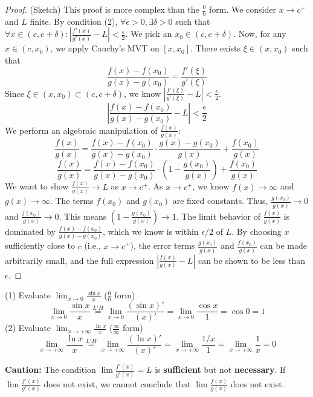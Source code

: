 \documentclass[oneside]{book}
\begin{document}
\begin{proof}
(Sketch) This proof is more complex than the $\frac{0}{0}$ form. We consider $x \to c^+$ and $L$ finite.
By condition (2), $\forall \epsilon > 0, \exists \delta > 0$ such that $\forall x \in (c, c+\delta): |\frac{f'(x)}{g'(x)} - L| < \frac{\epsilon}{2}$.
We pick an $x_0 \in (c, c+\delta)$.
Now, for any $x \in (c, x_0)$, we apply Cauchy's MVT on $[x, x_0]$. There exists $\xi \in (x, x_0)$ such that
\[
\frac{f(x) - f(x_0)}{g(x) - g(x_0)} = \frac{f'(\xi)}{g'(\xi)}
\]
Since $\xi \in (x, x_0) \subset (c, c+\delta)$, we know $|\frac{f'(\xi)}{g'(\xi)} - L| < \frac{\epsilon}{2}$.
\[
\left| \frac{f(x) - f(x_0)}{g(x) - g(x_0)} - L \right| < \frac{\epsilon}{2}
\]
We perform an algebraic manipulation of $\frac{f(x)}{g(x)}$:
\[
\frac{f(x)}{g(x)} = \frac{f(x) - f(x_0)}{g(x) - g(x_0)} \cdot \frac{g(x) - g(x_0)}{g(x)} + \frac{f(x_0)}{g(x)}
\]
\[
\frac{f(x)}{g(x)} = \frac{f(x) - f(x_0)}{g(x) - g(x_0)} \cdot \left(1 - \frac{g(x_0)}{g(x)}\right) + \frac{f(x_0)}{g(x)}
\]
We want to show $\frac{f(x)}{g(x)} \to L$ as $x \to c^+$.
As $x \to c^+$, we know $f(x) \to \infty$ and $g(x) \to \infty$. The terms $f(x_0)$ and $g(x_0)$ are fixed constants.
Thus, $\frac{g(x_0)}{g(x)} \to 0$ and $\frac{f(x_0)}{g(x)} \to 0$.
This means $\left(1 - \frac{g(x_0)}{g(x)}\right) \to 1$.
The limit behavior of $\frac{f(x)}{g(x)}$ is dominated by $\frac{f(x) - f(x_0)}{g(x) - g(x_0)}$, which we know is within $\epsilon/2$ of $L$.
By choosing $x$ sufficiently close to $c$ (i.e., $x \to c^+$), the error terms $\frac{g(x_0)}{g(x)}$ and $\frac{f(x_0)}{g(x)}$ can be made arbitrarily small, and the full expression $\left| \frac{f(x)}{g(x)} - L \right|$ can be shown to be less than $\epsilon$.
\end{proof}

\begin{example}
(1) Evaluate $\lim_{x \to 0} \frac{\sin x}{x}$ ($\frac{0}{0}$ form)
\[
\lim_{x \to 0} \frac{\sin x}{x} \overset{L'H}{=} \lim_{x \to 0} \frac{(\sin x)'}{(x)'} = \lim_{x \to 0} \frac{\cos x}{1} = \cos 0 = 1
\]
(2) Evaluate $\lim_{x \to +\infty} \frac{\ln x}{x}$ ($\frac{\infty}{\infty}$ form)
\[
\lim_{x \to +\infty} \frac{\ln x}{x} \overset{L'H}{=} \lim_{x \to +\infty} \frac{(\ln x)'}{(x)'} = \lim_{x \to +\infty} \frac{1/x}{1} = \lim_{x \to +\infty} \frac{1}{x} = 0
\]
\end{example}

\begin{remark}
\textbf{Caution:} The condition $\lim \frac{f'(x)}{g'(x)} = L$ is \textbf{sufficient} but not \textbf{necessary}. If $\lim \frac{f'(x)}{g'(x)}$ does not exist, we cannot conclude that $\lim \frac{f(x)}{g(x)}$ does not exist.
\end{remark}
\end{document}
